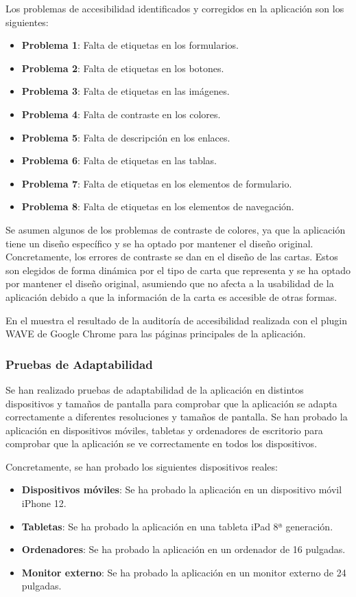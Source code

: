 Los problemas de accesibilidad identificados y corregidos en la aplicación son los siguientes:
\begin{itemize}
    \item \textbf{Problema 1}: Falta de etiquetas en los formularios.
    \item \textbf{Problema 2}: Falta de etiquetas en los botones.
    \item \textbf{Problema 3}: Falta de etiquetas en las imágenes.
    \item \textbf{Problema 4}: Falta de contraste en los colores.
    \item \textbf{Problema 5}: Falta de descripción en los enlaces.
    \item \textbf{Problema 6}: Falta de etiquetas en las tablas.
    \item \textbf{Problema 7}: Falta de etiquetas en los elementos de formulario.
    \item \textbf{Problema 8}: Falta de etiquetas en los elementos de navegación.
\end{itemize}

Se asumen algunos de los problemas de contraste de colores, ya que la aplicación tiene un diseño específico y se ha optado por mantener el diseño original.
Concretamente, los errores de contraste se dan en el diseño de las cartas. Estos son elegidos de forma dinámica por el tipo de carta que representa y se ha optado por mantener el diseño original,
asumiendo que no afecta a la usabilidad de la aplicación debido a que la información de la carta es accesible de otras formas.

En el 
muestra el resultado de la auditoría de accesibilidad realizada con el plugin WAVE de Google Chrome para las páginas principales de la aplicación.




\subsubsection{Pruebas de Adaptabilidad}
Se han realizado pruebas de adaptabilidad de la aplicación en distintos dispositivos y tamaños de pantalla para comprobar que la aplicación se adapta correctamente a diferentes resoluciones y tamaños de pantalla.
Se han probado la aplicación en dispositivos móviles, tabletas y ordenadores de escritorio para comprobar que la aplicación se ve correctamente en todos los dispositivos.

Concretamente, se han probado los siguientes dispositivos reales:
\begin{itemize}
    \item \textbf{Dispositivos móviles}: Se ha probado la aplicación en un dispositivo móvil iPhone 12.
    \item \textbf{Tabletas}: Se ha probado la aplicación en una tableta iPad 8ª generación.
    \item \textbf{Ordenadores}: Se ha probado la aplicación en un ordenador de 16 pulgadas.
    \item \textbf{Monitor externo}: Se ha probado la aplicación en un monitor externo de 24 pulgadas.
\end{itemize}

